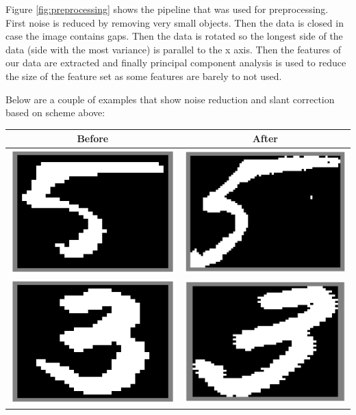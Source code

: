 \documentclass[%
        compressed,
        final,
        notitlepage,
        narroweqnarray,
        inline,
        twoside,
        ]{ieee}
\begin{document}
Figure \ref{fig:preprocessing} shows the pipeline that was used for preprocessing. First noise is reduced by removing very small objects. Then the data is closed in case the image contains gaps. Then the data is rotated so the longest side of the data (side with the most variance) is parallel to the x axis. Then the features of our data are extracted and finally principal component analysis is used to reduce the size of the feature set as some features are barely to not used.

Below are a couple of examples that show noise reduction and slant correction based on scheme above:


\begin{table}
    \begin{tabular}{|c|c|}
        \hline
        Before & After \\
        \hline
    \includegraphics[width=.4\columnwidth]{images/clean5.png}
    &\includegraphics[width=.4\columnwidth]{images/dirty5.png}\\
    \includegraphics[width=.4\columnwidth]{images/clean3.png}
    &\includegraphics[width=.4\columnwidth]{images/dirty3.png}\\

\end{tabular}
\end{table}
\end{document}
